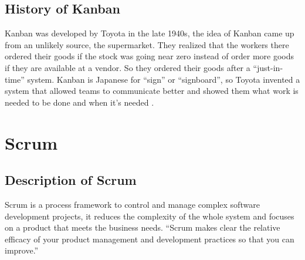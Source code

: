 \subsection{History of Kanban}
Kanban was developed by Toyota in the late 1940s, the idea of Kanban came up from an unlikely source, the supermarket. They realized that the workers there ordered their goods if the stock was going near zero instead of order more goods if they are available at a vendor. So they ordered their goods after a ``just-in-time'' system. Kanban is Japanese for ``sign'' or ``signboard'', so Toyota invented a system that allowed teams to communicate better and showed them what work is needed to be done and when it's needed \cite{WhatIsKanban}.

\section{Scrum}

\subsection{Description of Scrum}
Scrum is a process framework to control and manage complex software development projects, it reduces the complexity of the whole system and focuses on a product that meets the business needs. ``Scrum makes clear the relative efficacy of your product management and development practices so that you can improve.'' \cite{ScrumGuide}

